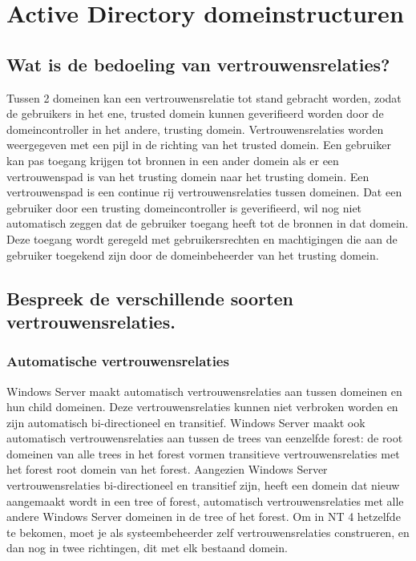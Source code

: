 \chapter{Active Directory domeinstructuren}

\section{Wat is de bedoeling van vertrouwensrelaties?}

Tussen 2 domeinen kan een vertrouwensrelatie tot stand gebracht worden, zodat de
gebruikers in het ene, trusted domein kunnen geverifieerd worden door de
domeincontroller in het andere, trusting domein. Vertrouwensrelaties worden
weergegeven met een pijl in de richting van het trusted domein. Een gebruiker
kan pas toegang krijgen tot bronnen in een ander domein als er een
vertrouwenspad is van het trusting domein naar het trusting domein. Een
vertrouwenspad is een continue rij vertrouwensrelaties tussen domeinen. Dat een
gebruiker door een trusting domeincontroller is geverifieerd, wil nog niet
automatisch zeggen dat de gebruiker toegang heeft tot de bronnen in dat domein.
Deze toegang wordt geregeld met gebruikersrechten en machtigingen die aan de
gebruiker toegekend zijn door de domeinbeheerder van het trusting domein.

\section{Bespreek de verschillende soorten vertrouwensrelaties.}

\subsection{Automatische vertrouwensrelaties}

Windows Server maakt automatisch vertrouwensrelaties aan tussen domeinen en hun
child domeinen. Deze vertrouwensrelaties kunnen niet verbroken worden en zijn
automatisch bi-directioneel en transitief. Windows Server maakt ook automatisch
vertrouwensrelaties aan tussen de trees van eenzelfde forest: de root domeinen
van alle trees in het forest vormen transitieve vertrouwensrelaties met het
forest root domein van het forest.
Aangezien Windows Server vertrouwensrelaties bi-directioneel en transitief zijn,
heeft een domein dat nieuw aangemaakt wordt in een tree of forest, automatisch
vertrouwensrelaties met alle andere Windows Server domeinen in de tree of het
forest.
Om in NT 4 hetzelfde te bekomen, moet je als systeembeheerder zelf
vertrouwensrelaties construeren, en dan nog in twee richtingen, dit met elk
bestaand domein.

